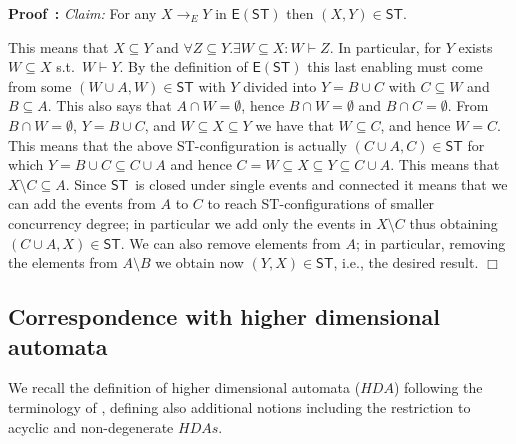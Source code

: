 \documentclass[submission,copyright,creativecommons]{eptcs}
\newenvironment{proof}[1][\!\!\,]{\vspace{1ex}\noindent\textbf{Proof #1: }}{\hfill$\Box$\vspace{2ex}}
\newcommand{\cp}[1]{}
\newcommand\HDA{\ensuremath{\mathit{HDA}}}
\newcommand\HDAs{\ensuremath{\mathit{HDAs}}}
\newcommand\ST{\ensuremath{\mathsf{ST}}}
\newcommand\allST{\ensuremath{\mathbb{ST}}}
\newcommand\allEv{\ensuremath{\mathbb{E}}}
\newcommand\stepTransEvGlabbeek{\ensuremath{\rightarrow_{E}}}
\newcommand\enableRelEv{\ensuremath{\vdash}}
\newcommand\isomorphic{\ensuremath{\cong}}
\newcommand\cintost{\ensuremath{\mathsf{ST}}}
\newcommand\stintoe{\ensuremath{\mathsf{E}}}
\newcommand\eintost{\ensuremath{\cintost}}
\begin{document}
\begin{proof}
\vspace{1ex}
\noindent\textit{Claim:}\hspace{1ex} For any $X\stepTransEvGlabbeek Y$ in $\stintoe(\ST)$ then $(X,Y)\in\ST$.
\vspace{0.5ex}

This means that $X\subseteq Y$ and $\forall Z\subseteq Y.\exists W\subseteq X:W\enableRelEv Z$. In particular, for $Y$ exists $W\subseteq X$ s.t.\ $W\enableRelEv Y$. 
By the definition of $\stintoe(\ST)$ this last enabling must come from some $(W\cup A,W)\in\ST$ with $Y$ divided into $Y=B\cup C$ with $C\subseteq W$ and $B\subseteq A$. This also says that $A\cap W=\emptyset$, hence $B\cap W=\emptyset$ and $B\cap C=\emptyset$. From $B\cap W=\emptyset$, $Y=B\cup C$, and $W\subseteq X\subseteq Y$ we have that $W\subseteq C$, and hence $W=C$. This means that the above ST-configuration is actually $(C\cup A,C)\in\ST$ for which $Y=B\cup C\subseteq C\cup A$ and hence $C=W\subseteq X\subseteq Y\subseteq C\cup A$. This means that $X\setminus C\subseteq A$. Since \ST\ is closed under single events and connected it means that we can add the events from $A$ to $C$ to reach ST-configurations of smaller concurrency degree; in particular we add only the events in $X\setminus C$ thus obtaining $(C\cup A,X)\in\ST$. We can also remove elements from $A$; in particular, removing the elements from $A\setminus B$ we obtain now $(Y,X)\in\ST$, i.e., the desired result.
\end{proof}

\cp{Can prove categorical results like equivalence of categories \allST\ and \allEv; in fact their respective sub-categories of rooted connected and adjacent-closed. Or one can look for adjoints since $E\isomorphic \stintoe(\eintost(E))$ and $ST\isomorphic\eintost(\stintoe(ST))$.}

\subsection{Correspondence with higher dimensional automata}

We recall the definition of higher dimensional automata (\HDA) following the terminology of \cite{Glabbeek06HDA,Pratt03trans_cancel}, defining also additional notions including the restriction to acyclic and non-degenerate \HDAs.
\end{document}
